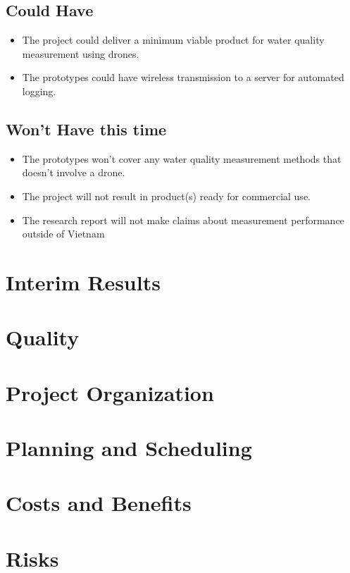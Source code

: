 \documentclass[11pt, a4paper]{article}
\begin{document}
\subsection{Could Have}
\begin{itemize}
  \item The project could deliver a minimum viable product for water quality measurement using drones.
  \item The prototypes could have wireless transmission to a server for automated logging.
\end{itemize}
\subsection{Won’t Have this time}
\begin{itemize}
  \item The prototypes won't cover any water quality measurement methods that doesn't involve a drone.
  \item The project will not result in product(s) ready for commercial use.
  \item The research report will not make claims about measurement performance outside of Vietnam
\end{itemize}

\section{Interim Results}

\section{Quality}

\section{Project Organization}

\section{Planning and Scheduling}

\section{Costs and Benefits}\label{costsandbenefits}

\section{Risks}
\end{document}
